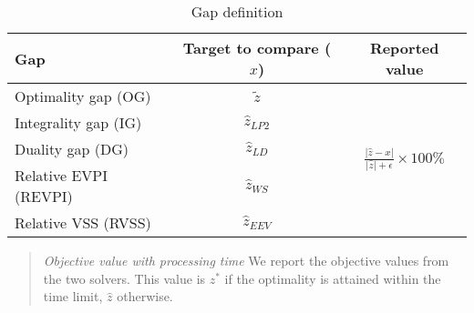 

\begin{table}[H]
	\centering
	\caption{Gap definition}
	\label{table:gap}
	\begin{tabular}{lcc}
		\hline
		Gap   & Target to compare ($x$) & Reported value                                                        \\ \hline
		Optimality gap (OG)   & $\tilde{z}$        & \multirow{5}{*}{$\frac{|\hat{z}-x|}{|\hat{z}|+\epsilon}\times 100\%$} \\
		Integrality gap (IG)   & $\hat{z}_{LP2}$    &                                                                       \\
		Duality gap (DG)   & $\hat{z}_{LD}$     &                                                                       \\
		Relative EVPI (REVPI) & $\hat{z}_{WS}$     &                                                                       \\
		Relative VSS (RVSS)  & $\hat{z}_{EEV}$    &                                                                       \\ \hline
	\end{tabular}
\end{table}

\begin{quote}
	\noindent\textit{Objective value with processing time} We report the objective values from the two solvers. This value is $z^*$ if the optimality is attained within the time limit, $\hat{z}$ otherwise.
\end{quote}

